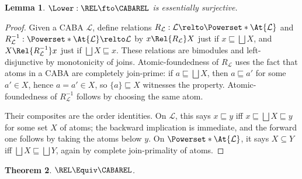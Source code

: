 \documentclass[10pt,a4paper]{article}
\newtheorem{theorem}{Theorem}
\newtheorem{lemma}[theorem]{Lemma}
\begin{document}
\begin{lemma}
  \label{lemma:lower-dense}
  \(\Lower : \REL \fto \CABAREL\) is essentially surjective.
\end{lemma}
\begin{proof}
  Given a CABA $\mathcal{L}$, define relations
  \(R_\mathcal{L} : \mathcal{L} \relto \Powerset*{\At{\mathcal{L}}}\) and
  \(R^{-1}_\mathcal{L} : \Powerset*{\At{\mathcal{L}}} \relto \mathcal{L}\) by
  \(x \Rel{R_\mathcal{L}} X\) just if \(x \sqsubseteq \bigsqcup X\), and
  \(X \Rel{R^{-1}_\mathcal{L}} x\) just if \(\bigsqcup X \sqsubseteq x\).
  These relations are bimodules and left-disjunctive by monotonicity of joins.
  Atomic-foundedness of \(R_\mathcal{L}\) uses the fact that atoms in a CABA are
  completely join-prime: if \(a \sqsubseteq \bigsqcup X\), then
  \(a \sqsubseteq a'\) for some \(a' \in X\), hence \(a = a' \in X\), so
  \(\{a\} \sqsubseteq X\) witnesses the property. Atomic-foundedness of
  \(R^{-1}_\mathcal{L}\) follows by choosing the same atom.

  Their composites are the order identities. On \(\mathcal{L}\), this says
  \(x \sqsubseteq y\) iff \(x \sqsubseteq \bigsqcup X \sqsubseteq y\) for some
  set \(X\) of atoms; the backward implication is immediate, and the forward
  one follows by taking the atoms below \(y\). On
  \(\Powerset*{\At{\mathcal{L}}}\), it says \(X \subseteq Y\) iff
  \(\bigsqcup X \sqsubseteq \bigsqcup Y\), again by complete join-primality of
  atoms.
\end{proof}

\begin{theorem}
  \label{theorem:cabarel-preduality}
  \(\REL \Equiv \CABAREL\).
\end{theorem}

\end{document}
